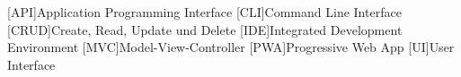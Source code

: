 \begin{acronym}[MMMMMM]
 
 	[API]{Application Programming Interface}
	[CLI]{Command Line Interface}
	[CRUD]{Create, Read, Update und Delete}
	[IDE]{Integrated Development Environment}
	[MVC]{Model-View-Controller}
	[PWA]{Progressive Web App}
	[UI]{User Interface}

	
	
\end{acronym}
